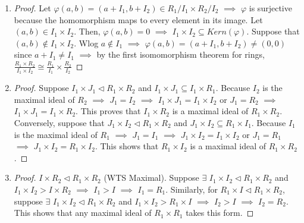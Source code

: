 \documentclass[11pt]{article}
\theoremstyle{definition}
\numberwithin{equation}{section}
\begin{document}
\begin{enumerate}
    \item \begin{proof}
    Let $\varphi(a, b) = (a+I_{1}, b+I_{2}) \in R_{1}/I_{1} \times R_{2}/I_{2}$ $\implies$ $\varphi$ is surjective because the homomorphism maps to every element in its image. Let $(a, b) \in I_{1} \times I_{2}$. Then, $\varphi(a, b) = 0$ $\implies$ $I_{1} \times I_{2} \subseteq Kern(\varphi)$. Suppose that $(a, b) \notin I_{1} \times I_{2}$. Wlog $a \notin I_{1}$ $\implies$ $\varphi(a, b) = (a+I_{1}, b+I_{2}) \neq (0, 0)$ since $a+I_{1} \neq I_{1}$ $\implies$ by the first isomomorphism theorem for rings, $\frac{R_{1} \times R_{2}}{I_{1} \times I_{2}} \cong \frac{R_{1}}{I_{1}} \times \frac{R_{2}}{I_{2}}$
    \end{proof}
    \item \begin{proof}
    Suppose $I_{1} \times J_{1} \vartriangleleft R_{1} \times R_{2}$ and $I_{1} \times J_{1} \subseteq I_{1} \times R_{1}$. Because $I_{2}$ is the maximal ideal of $R_{2}$ $\implies$ $J_{1} = I_{2}$ $\implies$ $I_{1} \times J_{1} = I_{1} \times I_{2}$ or $J_{1} = R_{2}$ $\implies$ $I_{1} \times J_{1} = I_{1} \times R_{2}$. This proves that $I_{1} \times R_{2}$ is a maximal ideal of $R_{1} \times R_{2}$.\\
    Conversely, suppose that $J_{1} \times I_{2} \vartriangleleft R_{1} \times R_{2}$ and $J_{1} \times I_{2} \subseteq R_{1} \times I_{1}$. Because $I_{1}$ is the maximal ideal of $R_{1}$ $\implies$ $J_{1} = I_{1}$ $\implies$ $J_{1} \times I_{2} = I_{1} \times I_{2}$ or $J_{1} = R_{1}$ $\implies$ $J_{1} \times I_{2} = R_{1} \times I_{2}$. This shows that $R_{1} \times I_{2}$ is a maximal ideal of $R_{1} \times R_{2}$.
    \end{proof}
    \item \begin{proof}$I \times R_{2} \vartriangleleft R_{1} \times R_{2}$ (WTS Maximal). Suppose $\exists$ $I_{1} \times I_{2} \vartriangleleft R_{1} \times R_{2}$ and $I_{1} \times I_{2} > I \times R_{2}$ $\implies$ $I_{1} > I$ $\implies$ $I_{1} = R_{1}$. Similarly, for $R_{1} \times I \vartriangleleft R_{1} \times R_{2}$, suppose $\exists$ $I_{1} \times I_{2} \vartriangleleft R_{1} \times R_{2}$ and $I_{1} \times I_{2} > R_{1} \times I$ $\implies$ $I_{2} > I$ $\implies$ $I_{2} = R_{2}$. This shows that any maximal ideal of $R_{1} \times R_{1}$ takes this form.
    \end{proof}
\end{enumerate}
\end{document}

